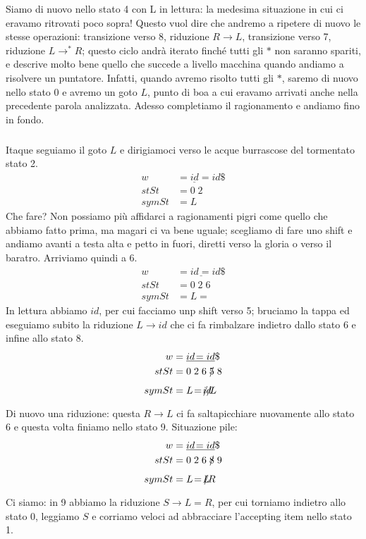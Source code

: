 \documentclass[class=book, crop=false, oneside, 12pt]{standalone}
\begin{document}
Siamo di nuovo nello stato 4 con L in lettura: la medesima situazione in cui ci eravamo ritrovati poco sopra! Questo vuol dire che andremo a ripetere di nuovo le stesse operazioni: transizione verso 8, riduzione \(R \to L\), transizione verso 7, riduzione \(L \to ^{*}R\); questo ciclo andrà iterato finché tutti gli \(\ast\) non saranno spariti, e descrive molto bene quello che succede a livello macchina quando andiamo a risolvere un puntatore. Infatti, quando avremo risolto tutti gli \(\ast\), saremo di nuovo nello stato 0 e avremo un goto \(L\), punto di boa a cui eravamo arrivati anche nella precedente parola analizzata. Adesso completiamo il ragionamento e andiamo fino in fondo.
\subparagraph*{}
Itaque seguiamo il goto \(L\) e dirigiamoci verso le acque burrascose del tormentato stato 2. 
\begin{align*}
    w &= \underline{id}\!=id\$ \\
    stSt &= 0\;2\\
    symSt &= L 
\end{align*}
Che fare? Non possiamo più affidarci a ragionamenti pigri come quello che abbiamo fatto prima, ma magari ci va bene uguale; scegliamo di fare uno shift e andiamo avanti a testa alta e petto in fuori, diretti verso la gloria o verso il baratro. Arriviamo quindi a 6.
\begin{align*}
    w &= \underline{id\!=}id\$ \\
    stSt &= 0\;2\;6 \\
    symSt &= L\!=
\end{align*}
In lettura abbiamo \(id\), per cui facciamo unp shift verso 5; bruciamo la tappa ed eseguiamo subito la riduzione \(L \to id\) che ci fa rimbalzare indietro dallo stato 6 e infine allo stato 8.
\begin{align*}
    w &= \underline{id\!=id}\$ \\
    stSt &= 0\;2\;6\;\xout{5}\;8 \\
    symSt &= L\!=\!\xout{id}\!L
\end{align*}
Di nuovo una riduzione: questa \(R \to L\) ci fa saltapicchiare nuovamente allo stato 6 e questa volta finiamo nello stato 9. Situazione pile:
\begin{align*}
    w &= \underline{id\!=id}\$ \\
    stSt &= 0\;2\;6\;\xout{8}\;9 \\
    symSt &= L\!=\!\xout{L}\!R
\end{align*}
Ci siamo: in 9 abbiamo la riduzione \(S \to L = R\), per cui torniamo indietro allo stato 0, leggiamo \(S\) e corriamo veloci ad abbracciare l'accepting item nello stato 1.
\end{document}
